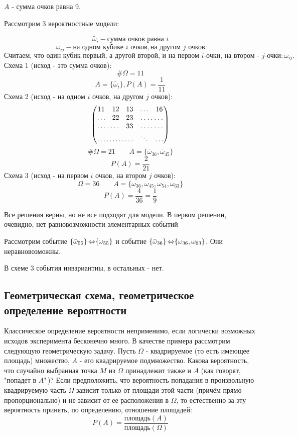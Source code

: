 \begin{exmp}
	$A$ - сумма очков равна 9.
	
	Рассмотрим 3 вероятностные модели:
	
	\[ \tilde{\omega_i} - \text{сумма очков равна } i \]
	\[ \tilde{\omega_{ij}} - \text{на одном кубике } i \text{ очков}, \text{на другом } j \text{ очков} \]
	\[ \text{Считаем, что один кубик первый, а другой второй, и на первом } i \text{-очки, на втором - } j\text{-очки} : \omega_{ij}. \]
	Схема 1 (исход - это сумма очков):
	\[ \# \Omega = 11 \]
	\[ A = \{\tilde{\omega_i}\}, P(A) = \frac{1}{11} \]
	Схема 2 (исход - на одном $i$ очков, на другом $j$ очков):
	\[
	\begin{pmatrix}
		11    & 12   & 13 & \dots & 16 \\
		\dots & 22   & 23 & \hdotsfor{2} \\
		\hdotsfor{2} & 33 & \hdotsfor{2} \\
		\hdotsfor{3} & \ddots & \dots
	\end{pmatrix}
	\]
	\[\# \Omega = 21 ~~~~~~~~~ A = \{ \bar \omega_{36}, \bar \omega_{45} \} \]
	\[ P(A) = \frac{2}{21} \]
	Схема 3 (исход - на первом $i$ очков, на втором $j$ очков):
	\[ \Omega = 36 ~~~~~~~~~ A = \{ \omega_{36}, \omega_{45}, \omega_{54}, \omega_{63} \} \]
	\[ P(A) = \frac{4}{36} = \frac{1}{9} \]
	
	Все решения верны, но не все подходят для модели. В первом решении, очевидно, нет равновозможности элементарных событий
	
	Рассмотрим событие $\{\bar \omega_{55}\} \operatorname{\Leftrightarrow} \{\omega_{55}\}$ и событие $\{\bar \omega_{36}\} \operatorname{\Leftrightarrow} \{\omega_{36}, \omega_{63}\}$. Они неравновозможны.
	
	В схеме 3 события инвариантны, в остальных - нет.
\end{exmp}

\subsection{Геометрическая схема, геометрическое определение вероятности}

Классическое определение вероятности неприменимо, если логически возможных исходов эксперимента бесконечно много. В качестве примера рассмотрим следующую геометрическую задачу. Пусть $\Omega$ - квадрируемое (то есть имеющее площадь) множество, $A$ - его квадрируемое подмножество. Какова вероятность, что случайно выбранная точка $M$ из $\Omega$ принадлежит также и $A$ (как говорят, "попадет в $A$"\,)? Если предположить, что вероятность попадания в произвольную квадрируемую часть $\Omega$ зависит только от площади этой части (причём прямо пропорционально) и не зависит от ее расположения в $\Omega$, то естественно за эту вероятность принять, по определению, отношение площадей:
\[ P(A) = \frac{\text{площадь}(A)}{\text{площадь}(\Omega)} \]

